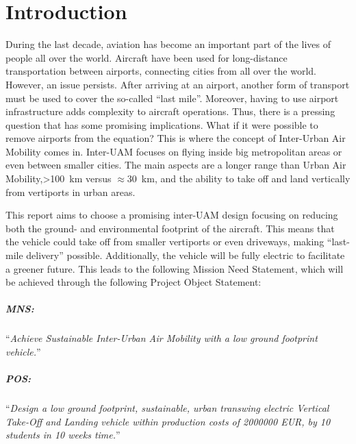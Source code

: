 \chapter{Introduction}
\label{ch:Introduction}


During the last decade, aviation has become an important part of the lives of people all over the world.
Aircraft have been used for long-distance transportation between airports, connecting cities from all over the world.
However, an issue persists.
After arriving at an airport, another form of transport must be used to cover the so-called \enquote{last mile}.
Moreover, having to use airport infrastructure adds complexity to aircraft operations.
Thus, there is a pressing question that has some promising implications.
What if it were possible to remove airports from the equation?
This is where the concept of Inter-Urban Air Mobility comes in.
Inter-UAM focuses on flying inside big metropolitan areas or even between smaller cities.
The main aspects are a longer range than Urban Air Mobility,\qty{>100}{km} versus $\approx$\qty{30}{km}, and the ability to take off and land vertically from vertiports in urban areas.

 This report aims to choose a promising inter-UAM design focusing on reducing both the ground- and environmental footprint of the aircraft.
 This means that the vehicle could take off from smaller vertiports or even driveways, making \enquote{last-mile delivery} possible.
 Additionally, the vehicle will be fully electric to facilitate a greener future.
 This leads to the following Mission Need Statement, which will be achieved through the following Project Object Statement:

\paragraph{MNS:}“\textit{Achieve Sustainable Inter-Urban Air Mobility with a low ground footprint vehicle.}”
\vspace{-5mm}
\paragraph{POS:}“\textit{Design a low ground footprint, sustainable, urban transwing electric Vertical Take-Off and Landing vehicle within production costs of 2000000 EUR, by 10 students in 10 weeks time.}”

